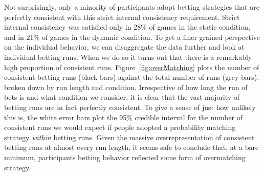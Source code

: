 \documentclass[authoryear]{elsarticle}
\begin{document}

Not surprisingly, only a minority of participants adopt betting strategies that are perfectly consistent with this strict internal consistency requirement. Strict internal consistency was satisfied only in 28\% of games in the static condition, and in 21\% of games in the dynamic condition. To get a finer grained perspective on the individual behavior, we can disaggregate the data further and look at  individual betting runs. When we do so it turns out that there is a remarkably high proportion of consistent runs. Figure~\ref{fig:overMatching} plots the number of consistent betting runs (black bars) against the total number of runs (grey bars), broken down by run length and condition. Irrespective of how long the run of bets is and what condition we consider, it is clear that the vast majority of betting runs are in fact perfectly consistent. To give a sense of just how unlikely this is, the white error bars plot the 95\% credible interval for the number of consistent runs we would expect if people adopted a probability matching strategy {\it within} betting runs. Given the massive overrepresentation of consistent betting runs at almost every run length, it seems safe to conclude that, at a bare minimum, participants betting behavior reflected some form of overmatching strategy.
\end{document}
